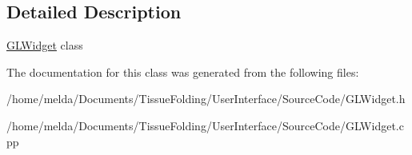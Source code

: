 \subsection{Detailed Description}
\hyperlink{classGLWidget}{G\+L\+Widget} class 

The documentation for this class was generated from the following files\+:\begin{DoxyCompactItemize}
\item 
/home/melda/\+Documents/\+Tissue\+Folding/\+User\+Interface/\+Source\+Code/G\+L\+Widget.\+h\item 
/home/melda/\+Documents/\+Tissue\+Folding/\+User\+Interface/\+Source\+Code/G\+L\+Widget.\+cpp\end{DoxyCompactItemize}
